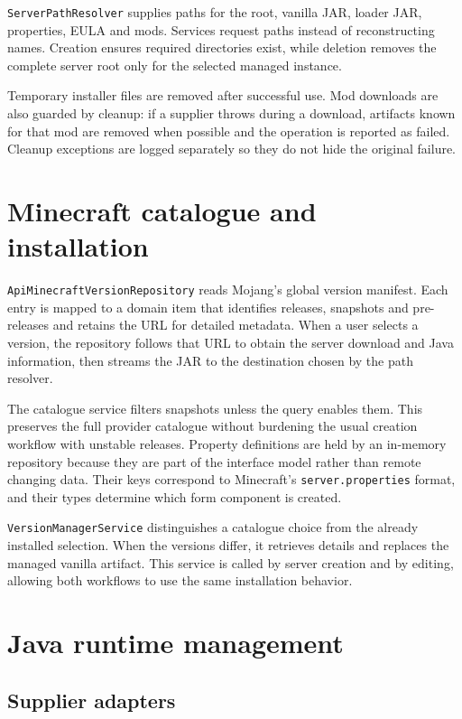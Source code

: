 \texttt{ServerPathResolver} supplies paths for the root, vanilla JAR, loader JAR, properties, EULA and mods. Services request paths instead of reconstructing names. Creation ensures required directories exist, while deletion removes the complete server root only for the selected managed instance.

Temporary installer files are removed after successful use. Mod downloads are also guarded by cleanup: if a supplier throws during a download, artifacts known for that mod are removed when possible and the operation is reported as failed. Cleanup exceptions are logged separately so they do not hide the original failure.

\section{Minecraft catalogue and installation}

\texttt{ApiMinecraftVersionRepository} reads Mojang's global version manifest. Each entry is mapped to a domain item that identifies releases, snapshots and pre-releases and retains the URL for detailed metadata. When a user selects a version, the repository follows that URL to obtain the server download and Java information, then streams the JAR to the destination chosen by the path resolver.

The catalogue service filters snapshots unless the query enables them. This preserves the full provider catalogue without burdening the usual creation workflow with unstable releases. Property definitions are held by an in-memory repository because they are part of the interface model rather than remote changing data. Their keys correspond to Minecraft's \texttt{server.properties} format, and their types determine which form component is created.

\texttt{VersionManagerService} distinguishes a catalogue choice from the already installed selection. When the versions differ, it retrieves details and replaces the managed vanilla artifact. This service is called by server creation and by editing, allowing both workflows to use the same installation behavior.

\section{Java runtime management}

\subsection{Supplier adapters}

